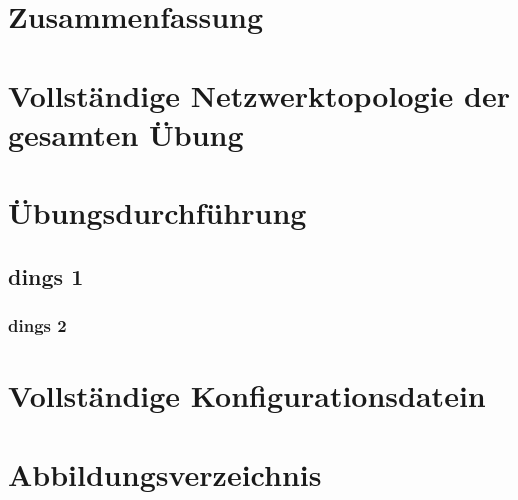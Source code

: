 \documentclass[a4paper]{article}
\begin{document}
\section{Zusammenfassung}

\newpage

\section{Vollständige Netzwerktopologie der gesamten Übung}

\newpage

\section{Übungsdurchführung}

\subsection{dings 1}

\subsubsection{dings 2}

\newpage

\section{Vollständige Konfigurationsdatein}

\newpage

\section{Abbildungsverzeichnis}

\listoffigures
\end{document}
